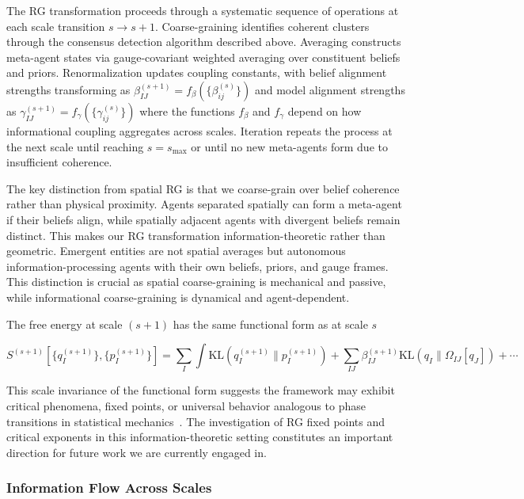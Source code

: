 \documentclass[11pt]{article}
\begin{document}
The RG transformation proceeds through a systematic sequence of operations at each scale transition $s \to s+1$. Coarse-graining identifies coherent clusters through the consensus detection algorithm described above. Averaging constructs meta-agent states via gauge-covariant weighted averaging over constituent beliefs and priors. Renormalization updates coupling constants, with belief alignment strengths transforming as $\beta_{IJ}^{(s+1)} = f_\beta(\{\beta_{ij}^{(s)}\})$ and model alignment strengths as $\gamma_{IJ}^{(s+1)} = f_\gamma(\{\gamma_{ij}^{(s)}\})$ where the functions $f_\beta$ and $f_\gamma$ depend on how informational coupling aggregates across scales. Iteration repeats the process at the next scale until reaching $s = s_{\max}$ or until no new meta-agents form due to insufficient coherence.

The key distinction from spatial RG is that we coarse-grain over belief coherence rather than physical proximity. Agents separated spatially can form a meta-agent if their beliefs align, while spatially adjacent agents with divergent beliefs remain distinct. This makes our RG transformation information-theoretic rather than geometric. Emergent entities are not spatial averages but autonomous information-processing agents with their own beliefs, priors, and gauge frames. This distinction is crucial as spatial coarse-graining is mechanical and passive, while informational coarse-graining is dynamical and agent-dependent.

The free energy at scale $(s+1)$ has the same functional form as at scale $s$

\begin{equation}
S^{(s+1)}[\{q_I^{(s+1)}\}, \{p_I^{(s+1)}\}] = \sum_I \int \mathrm{KL}(q_I^{(s+1)} \| p_I^{(s+1)}) + \sum_{IJ} \beta_{IJ}^{(s+1)} \mathrm{KL}(q_I \| \Omega_{IJ}[q_J]) + \cdots
\end{equation}

This scale invariance of the functional form suggests the framework may exhibit critical phenomena, fixed points, or universal behavior analogous to phase transitions in statistical mechanics~\cite{Wilson1974}. The investigation of RG fixed points and critical exponents in this information-theoretic setting constitutes an important direction for future work we are currently engaged in.

\subsubsection{Information Flow Across Scales}
\end{document}
